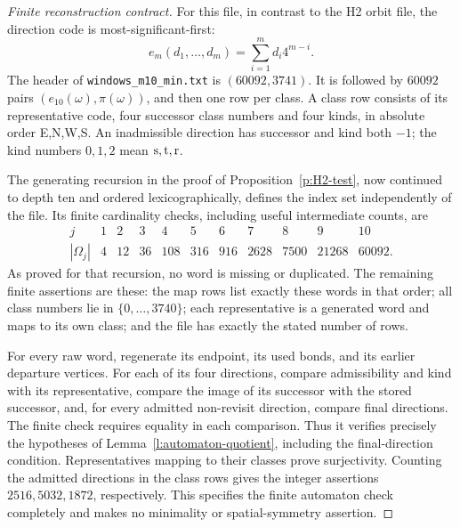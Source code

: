 \begin{proof}[Finite reconstruction contract]
For this file, in contrast to the H2 orbit file, the direction code
is most-significant-first:
\[
 e_m(d_1,\ldots,d_m)=\sum_{i=1}^m d_i4^{m-i}.
\]
The header of \texttt{windows\_m10\_min.txt} is
\((60092,3741)\). It is followed by \(60092\) pairs
\((e_{10}(\omega),\pi(\omega))\), and then one row per class.
A class row consists of its representative code, four successor
class numbers and four kinds, in absolute order E,N,W,S.
An inadmissible direction has successor and kind both \(-1\);
the kind numbers \(0,1,2\) mean \({\rm s},{\rm t},{\rm r}\).

The generating recursion in the proof of
Proposition~\ref{p:H2-test}, now continued to depth ten and ordered
lexicographically, defines the index set independently of the file.
Its finite cardinality checks, including useful intermediate counts,
are
\[
 \begin{array}{c|rrrrrrrrrr}
 j&1&2&3&4&5&6&7&8&9&10\\ \hline
 |\Omega_j|&4&12&36&108&316&916&2628&7500&21268&60092.
 \end{array}
\]
As proved for that recursion, no word is missing or duplicated.
The remaining finite assertions are these: the map rows list exactly
these words in that order; all class numbers lie in
\(\{0,\ldots,3740\}\); each representative is a generated word
and maps to its own class; and the file has exactly the stated
number of rows.

For every raw word, regenerate its endpoint, its used bonds, and its
earlier departure vertices. For each of its four directions, compare
admissibility and kind with its representative, compare the image
of its successor with the stored successor, and, for every admitted
non-revisit direction, compare final directions. The finite check
requires equality in each comparison. Thus it verifies precisely
the hypotheses of Lemma~\ref{l:automaton-quotient}, including the
final-direction condition. Representatives mapping to their classes
prove surjectivity. Counting the admitted directions in the class
rows gives the integer assertions \(2516,5032,1872\), respectively.
This specifies the finite automaton check completely and makes no
minimality or spatial-symmetry assertion.
\end{proof}

